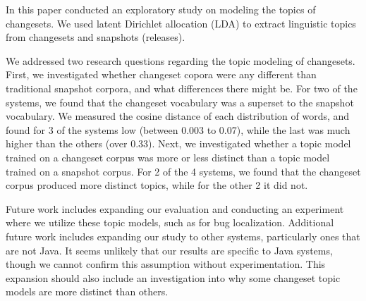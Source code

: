 
In this paper conducted an exploratory study on modeling the topics of
changesets.
We used latent Dirichlet allocation (LDA) to extract linguistic
topics from changesets and snapshots (releases).

We addressed two research questions regarding the topic modeling of changesets.
First, we investigated whether changeset copora were any different than
traditional snapshot corpora, and what differences there might be.
For two of the systems, we found that the changeset vocabulary was a superset
to the snapshot vocabulary.
We measured the cosine distance of each distribution of words,
and found for 3 of the systems low (between 0.003 to 0.07),
while the last was much higher than the others (over 0.33).
Next, we investigated whether a topic model trained on a changeset corpus
was more or less distinct than a topic model trained on a snapshot corpus.
For 2 of the 4 systems, we found that the changeset corpus produced more
distinct topics, while for the other 2 it did not.


Future work includes expanding our evaluation and conducting an experiment
where we utilize these topic models, such as for bug localization.
Additional future work includes expanding our study to other systems, particularly ones that are not Java.
It seems unlikely that our results are specific to Java systems, though we cannot confirm this assumption without experimentation.
This expansion should also include an investigation into why some
changeset topic models are more distinct than others.
